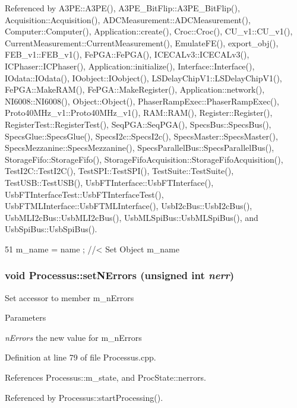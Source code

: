 Referenced by A3PE::A3PE(), A3PE\_\-BitFlip::A3PE\_\-BitFlip(), Acquisition::Acquisition(), ADCMeasurement::ADCMeasurement(), Computer::Computer(), Application::create(), Croc::Croc(), CU\_\-v1::CU\_\-v1(), CurrentMeasurement::CurrentMeasurement(), EmulateFE(), export\_\-obj(), FEB\_\-v1::FEB\_\-v1(), FePGA::FePGA(), ICECALv3::ICECALv3(), ICPhaser::ICPhaser(), Application::initialize(), Interface::Interface(), IOdata::IOdata(), IOobject::IOobject(), LSDelayChipV1::LSDelayChipV1(), FePGA::MakeRAM(), FePGA::MakeRegister(), Application::network(), NI6008::NI6008(), Object::Object(), PhaserRampExec::PhaserRampExec(), Proto40MHz\_\-v1::Proto40MHz\_\-v1(), RAM::RAM(), Register::Register(), RegisterTest::RegisterTest(), SeqPGA::SeqPGA(), SpecsBus::SpecsBus(), SpecsGlue::SpecsGlue(), SpecsI2c::SpecsI2c(), SpecsMaster::SpecsMaster(), SpecsMezzanine::SpecsMezzanine(), SpecsParallelBus::SpecsParallelBus(), StorageFifo::StorageFifo(), StorageFifoAcquisition::StorageFifoAcquisition(), TestI2C::TestI2C(), TestSPI::TestSPI(), TestSuite::TestSuite(), TestUSB::TestUSB(), UsbFTInterface::UsbFTInterface(), UsbFTInterfaceTest::UsbFTInterfaceTest(), UsbFTMLInterface::UsbFTMLInterface(), UsbI2cBus::UsbI2cBus(), UsbMLI2cBus::UsbMLI2cBus(), UsbMLSpiBus::UsbMLSpiBus(), and UsbSpiBus::UsbSpiBus().


\begin{DoxyCode}
51 { m_name  = name  ; } //< Set Object m_name
\end{DoxyCode}
\hypertarget{classProcessus_a831b027b9cf18ab56fa6147b5d3055da}{
\subsubsection[{setNErrors}]{\setlength{\rightskip}{0pt plus 5cm}void Processus::setNErrors (unsigned int {\em nerr})}}
\label{classProcessus_a831b027b9cf18ab56fa6147b5d3055da}
Set accessor to member m\_\-nErrors 
\begin{DoxyParams}{Parameters}
\item[{\em nErrors}]the new value for m\_\-nErrors \end{DoxyParams}


Definition at line 79 of file Processus.cpp.

References Processus::m\_\-state, and ProcState::nerrors.

Referenced by Processus::startProcessing().


